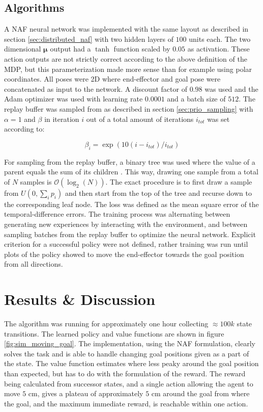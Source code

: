 \subsection{Algorithms}

A NAF neural network was implemented with the same layout as described in
section \ref{sec:distributed_naf} with two hidden layers of $100$ units each.
The two dimensional $\mathbf{\mu}$ output had a $\tanh$ function scaled by
$0.05$ as activation. These  action outputs are not strictly correct according
to the above definition of the MDP, but this parameterization made more sense
than for example using polar coordinates. All poses were 2D where end-effector
and goal pose were concatenated as input to the network. A discount factor of
$0.98$ was used and the Adam optimizer \cite{kingma2014adam} was used with
learning rate $0.0001$ and a batch size of $512$. The replay buffer was sampled
from as described in section \ref{sec:prio_sampling} with $\alpha = 1$ and
$\beta$ in iteration $i$ out of a total amount of iterations $i_{tot}$ was set
according to:

\begin{equation}
    \beta_i = \exp \left( 10(i - i_{tot}) / i_{tot}\right)
\end{equation}

For sampling from the replay buffer, a binary tree was used where the value of
a parent equals the sum of its children \cite{schaul2015prioritized}. This way,
drawing one sample from a total of $N$ samples is $\mathcal{O}(\log_2(N))$. The
exact procedure is to first draw a sample from $U(0, \sum_i p_i)$ and then
start from the top of the tree and recurse down to the corresponding leaf node.
The loss was defined as the mean square error of the temporal-difference
errors. The training process was alternating between generating new experiences
by interacting with the environment, and between sampling batches from the
replay buffer to optimize the neural network. Explicit criterion for a
successful policy were not defined, rather training was run until plots of the
policy showed to move the end-effector towards the goal position from all
directions.

\section{Results \& Discussion}

The algorithm was running for approximately one hour collecting $\approx 100k$
state transitions. The learned policy and value functions are shown in figure
\ref{fig:sim_moving_goal}. The implementation, using the NAF formulation,
clearly solves the task and is able to handle changing goal positions given as
a part of the state. The value function estimates where less peaky around the
goal position than expected, but has to do with the formulation of the reward.
The reward being calculated from successor states, and a single action allowing
the agent to move $5$ cm, gives a plateau of approximately $5$ cm around the
goal from where the goal, and the maximum immediate reward, is reachable within
one action.

